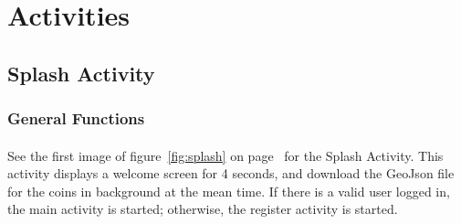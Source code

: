 \documentclass[12pt]{article}
\begin{document}
%
%
\section{Activities}
\label{sec:activity}

\subsection{Splash Activity}
\subsubsection{General Functions}
\paragraph{}
See the first image of figure~\ref{fig:splash} on page~\pageref{fig:splash} for the Splash Activity. This activity displays a welcome screen for 4 seconds, and download the GeoJson file for the coins in background at the mean time. If there is a valid user logged in, the main activity is started; otherwise, the register activity is started.
\end{document}
